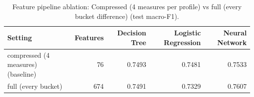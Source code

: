 \begin{table}[ht]
\centering
\small
\caption{Feature pipeline ablation: Compressed (4 measures per profile) vs full (every bucket difference) (test macro-F1).}
\label{tab:pipeline-block-differences}
\begin{tabular}{lrrrr}
\toprule
Setting & Features & Decision Tree & Logistic Regression & Neural Network \\
\midrule
compressed (4 measures) (baseline) & 76 & 0.7493 & 0.7481 & 0.7533 \\
full (every bucket) & 674 & 0.7491 & 0.7329 & 0.7607 \\
\bottomrule
\end{tabular}
\end{table}

